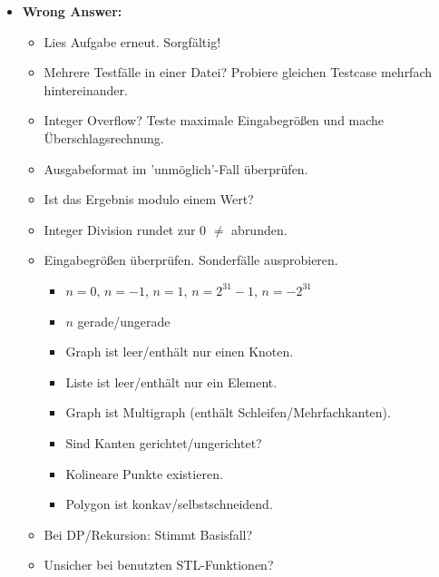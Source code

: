 \begin{itemize}
	\item \textbf{Wrong Answer:}
	\begin{itemize}
		\item Lies Aufgabe erneut. Sorgfältig!
		\item Mehrere Testfälle in einer Datei? Probiere gleichen Testcase mehrfach hintereinander.
		\item Integer Overflow? Teste maximale Eingabegrößen und mache Überschlagsrechnung.
		\item Ausgabeformat im 'unmöglich'-Fall überprüfen.
		\item Ist das Ergebnis modulo einem Wert?
		\item Integer Division rundet zur $0$ $\neq$ abrunden.
		\item Eingabegrößen überprüfen. Sonderfälle ausprobieren.
		\begin{itemize}
			\item $n = 0$, $n = -1$, $n = 1$, $n = 2^{31}-1$, $n = -2^{31}$
			\item $n$ gerade/ungerade
			\item Graph ist leer/enthält nur einen Knoten.
			\item Liste ist leer/enthält nur ein Element.
			\item Graph ist Multigraph (enthält Schleifen/Mehrfachkanten).
			\item Sind Kanten gerichtet/ungerichtet?
			\item Kolineare Punkte existieren.
			\item Polygon ist konkav/selbstschneidend.
		\end{itemize}
		\item Bei DP/Rekursion: Stimmt Basisfall?
		\item Unsicher bei benutzten STL-Funktionen?
	\end{itemize}
\end{itemize}



